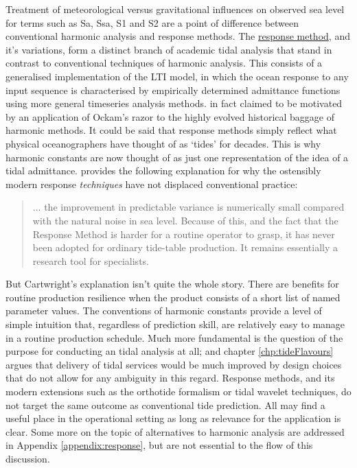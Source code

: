Treatment of meteorological versus gravitational influences on observed sea level for terms such as Sa, Ssa, S1 and S2 are a point of difference between conventional harmonic analysis and response methods.  
The \underline{response method}, and it's variations, form a distinct branch of academic tidal analysis that stand in contrast to conventional techniques of harmonic analysis.   This consists of a generalised implementation of the LTI model, in which the ocean response to any input sequence is characterised by empirically determined admittance functions using more general timeseries analysis methods.  
\citet{Munk:1966ts} in fact claimed to be motivated by an application of Ockam's razor to the highly evolved historical baggage of harmonic methods.   
It could be said that response methods simply reflect what physical oceanographers have thought of as `tides' for decades.  This is why harmonic constants are now thought of as just one representation of the idea of a tidal admittance. 
\citep[pp 198]{Cartwright:2000tt} provides the following explanation for why the ostensibly modern response \emph{techniques} have not displaced conventional practice: 
\begin{quotation}
    $\dots$ the improvement in predictable variance is numerically small compared with the natural noise in sea level.   Because of this, and the fact that the Response Method is harder for a routine operator to grasp, it has never been adopted for ordinary tide-table production. It remains essentially a research tool for specialists. 
\end{quotation}
But Cartwright's explanation isn't quite the whole story.   
There are benefits for routine production resilience when the product consists of a short list of named parameter values.   The conventions of harmonic constants provide a level of simple intuition that, regardless of prediction skill, are relatively easy to manage in a routine production schedule.
Much more fundamental is the question of the purpose for conducting an tidal analysis at all; and chapter \ref{chp:tideFlavours} argues that delivery of tidal services would be much improved by design choices that do not allow for any ambiguity in this regard.   
Response methods, and its modern extensions such as the orthotide formalism or tidal wavelet techniques, do not target the same outcome as conventional tide prediction.   All may find a useful place in the operational setting as long as relevance for the application is clear. 
Some more on the topic of alternatives to harmonic analysis are addressed in Appendix \ref{appendix:response}, but are not essential to the flow of this discussion.


